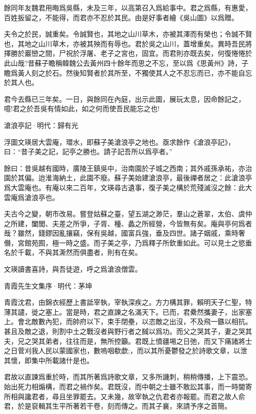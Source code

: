 \documentclass[12pt,a4paper]{ctexbook}
\begin{document}
餘同年友魏君用晦爲吳縣，未及三年，以高第召入爲給事中。君之爲縣，有惠愛，百姓扳留之，不能得，而君亦不忍於其民。由是好事者繪《吳山圖》以爲贈。\par
夫令之於民，誠重矣。令誠賢也，其地之山川草木，亦被其澤而有榮也；令誠不賢也，其地之山川草木，亦被其殃而有辱也。君於吳之山川，蓋增重矣。異時吾民將擇勝於巖巒之間，尸祝於浮屠、老子之宮也，固宜。而君則亦既去矣，何復惓惓於此山哉?昔蘇子瞻稱韓魏公去黃州四十餘年而思之不忘，至以爲《思黃州》詩，子瞻爲黃人刻之於石。然後知賢者於其所至，不獨使其人之不忍忘而已，亦不能自忘於其人也。\par
君今去縣已三年矣。一日，與餘同在內庭，出示此圖，展玩太息，因命餘記之，噫!君之於吾吳有情如此，如之何而使吾民能忘之也!\par
滄浪亭記·明代：歸有光 \par
浮圖文瑛居大雲庵，環水，即蘇子美滄浪亭之地也。亟求餘作《滄浪亭記》，曰：“昔子美之記，記亭之勝也。請子記吾所以爲亭者。”\par
餘曰：昔吳越有國時，廣陵王鎮吳中，治南園於子城之西南；其外戚孫承祐，亦治園於其偏。迨淮海納土，此園不廢。蘇子美始建滄浪亭，最後禪者居之：此滄浪亭爲大雲庵也。有庵以來二百年，文瑛尋古遺事，復子美之構於荒殘滅沒之餘：此大雲庵爲滄浪亭也。\par
夫古今之變，朝市改易。嘗登姑蘇之臺，望五湖之渺茫，羣山之蒼翠，太伯、虞仲之所建，闔閭、夫差之所爭，子胥、種、蠡之所經營，今皆無有矣。庵與亭何爲者哉？雖然，錢鏐因亂攘竊，保有吳越，國富兵強，垂及四世。諸子姻戚，乘時奢僭，宮館苑囿，極一時之盛。而子美之亭，乃爲釋子所欽重如此。可以見士之慾垂名於千載，不與其澌然而俱盡者，則有在矣。\par
文瑛讀書喜詩，與吾徒遊，呼之爲滄浪僧雲。\par
青霞先生文集序·明代：茅坤 \par
青霞沈君，由錦衣經歷上書詆宰執，宰執深疾之。方力構其罪，賴明天子仁聖，特薄其譴，徙之塞上。當是時，君之直諫之名滿天下。已而，君纍然攜妻子，出家塞上。會北敵數內犯，而帥府以下，束手閉壘，以恣敵之出沒，不及飛一鏃以相抗。甚且及敵之退，則割中土之戰沒者與野行者之馘以爲功。而父之哭其子，妻之哭其夫，兄之哭其弟者，往往而是，無所控籲。君既上憤疆埸之日弛，而又下痛諸將士之日菅刈我人民以蒙國家也，數嗚咽欷歔;，而以其所憂鬱發之於詩歌文章，以泄其懷，即集中所載諸什是也。\par
君故以直諫爲重於時，而其所著爲詩歌文章，又多所譏刺，稍稍傳播，上下震恐。始出死力相煽構，而君之禍作矣。君既沒，而中朝之士雖不敢訟其事，而一時閫寄所相與讒君者，尋且坐罪罷去。又未幾，故宰執之仇君者亦報罷。而君之故人俞君，於是裒輯其生平所著若干卷，刻而傳之。而其子襄，來請予序之首簡。\par
\end{document}
